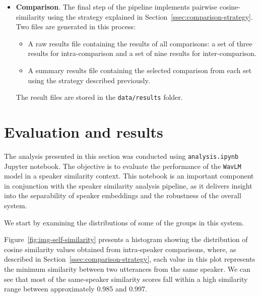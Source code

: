 \documentclass[conference]{IEEEtran}
\begin{document}
\begin{itemize}
		\item \textbf{Comparison}. The final step of the pipeline implements pairwise cosine-similarity using the strategy explained in Section~\ref{ssec:comparison-strategy}. Two files are generated in this process:
		
		\begin{itemize}
			\item A raw results file containing the results of all comparisons: a set of three results for intra-comparison and a set of nine results for inter-comparison.
			\item A summary results file containing the selected comparison from each set using the strategy described previously.
		\end{itemize}
		
		The result files are stored in the \texttt{data/results} folder.
	\end{itemize}
	
	\section{Evaluation and results}
	\label{scn:evaluation-and-results}
	
	The analysis presented in this section was conducted using \texttt{analysis.ipynb} Jupyter notebook. The objective is to evaluate the performance of the \texttt{WavLM} model in a speaker similarity context. 
	This notebook is an important component in conjunction with the speaker similarity analysis pipeline, as it delivers insight into the separability of speaker embeddings and the robustness of the overall system.
	
	We start by examining the distributions of some of the groups in this system. 
	
	Figure~\ref{fig:img-self-similarity} presents a histogram showing the distribution of cosine similarity values obtained from intra-speaker comparisons, where, as described in Section~\ref{ssec:comparison-strategy}, each value in this plot represents the minimum similarity between two utterances from the same speaker. We can see that most of the same-speaker similarity scores fall within a high similarity range between approximately 0.985 and 0.997. 
	
\end{document}
